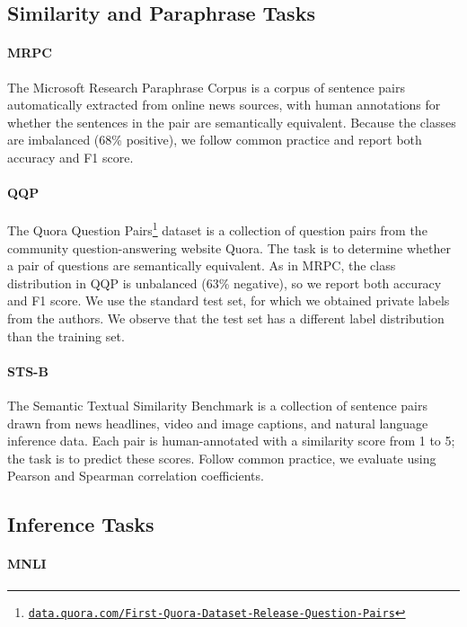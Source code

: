 \subsection{Similarity and Paraphrase Tasks}

\paragraph{MRPC}
The Microsoft Research Paraphrase Corpus \citep{dolan2005automatically} is a corpus of sentence pairs automatically extracted from online news sources, with human annotations for whether the sentences in the pair are semantically equivalent. Because the classes are imbalanced (68\% positive), we follow common practice and report both accuracy and F1 score.

\paragraph{QQP}
The Quora Question Pairs\footnote{ \href{https://data.quora.com/First-Quora-Dataset-Release-Question-Pairs}{\texttt{data.quora.com/\allowbreak First-\allowbreak Quora-\allowbreak Dataset-\allowbreak Release-Question-Pairs}}} dataset is a collection of question pairs from the community question-answering website Quora. The task is to determine whether a pair of questions are semantically equivalent. As in MRPC, the class distribution in QQP is unbalanced (63\% negative), so we report both accuracy and F1 score. We use the standard test set, for which we obtained private labels from the authors. We observe that the test set has a different label distribution than the training set.

\paragraph{STS-B}
The Semantic Textual Similarity Benchmark \citep{cer2017semeval} is a collection of sentence pairs drawn from news headlines, video and image captions, and natural language inference data. Each pair is human-annotated with a similarity score from 1 to 5; the task is to predict these scores. Follow common practice, we evaluate using Pearson and Spearman correlation coefficients.

\subsection{Inference Tasks}

\paragraph{MNLI}

